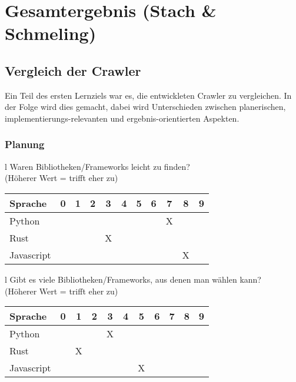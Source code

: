 \chapter{Gesamtergebnis \small{(Stach \& Schmeling)}}

\section{Vergleich der Crawler}
Ein Teil des ersten Lernziels war es, die entwickleten Crawler zu vergleichen.
In der Folge wird dies gemacht, dabei wird Unterschieden zwischen
planerischen, implementierungs-relevanten und ergebnis-orientierten Aspekten.


\subsection{Planung}

\begin{tabular}{l}
	Waren Bibliotheken/Frameworks leicht zu finden? \\
	(Höherer Wert = trifft eher zu)                 \\
	\begin{tabular}{| l | c | c | c | c | c | c | c | c | c | c |}
		\hline
		Sprache    & 0 & 1 & 2 & 3 & 4 & 5 & 6 & 7 & 8 & 9 \\
		\hline
		Python     &   &   &   &   &   &   &   & X &   &   \\
		\hline
		Rust       &   &   &   & X &   &   &   &   &   &   \\
		\hline
		Javascript &   &   &   &   &   &   &   &   & X &   \\
		\hline
	\end{tabular}
\end{tabular}

\begin{tabular}{l}
	Gibt es viele Bibliotheken/Frameworks, aus denen man wählen kann? \\
	(Höherer Wert = trifft eher zu)                                   \\
	\begin{tabular}{| l | c | c | c | c | c | c | c | c | c | c |}
		\hline
		Sprache    & 0 & 1 & 2 & 3 & 4 & 5 & 6 & 7 & 8 & 9 \\
		\hline
		Python     &   &   &   & X &   &   &   &   &   &   \\
		\hline
		Rust       &   & X &   &   &   &   &   &   &   &   \\
		\hline
		Javascript &   &   &   &   &   & X &   &   &   &   \\
		\hline
	\end{tabular}
\end{tabular}

